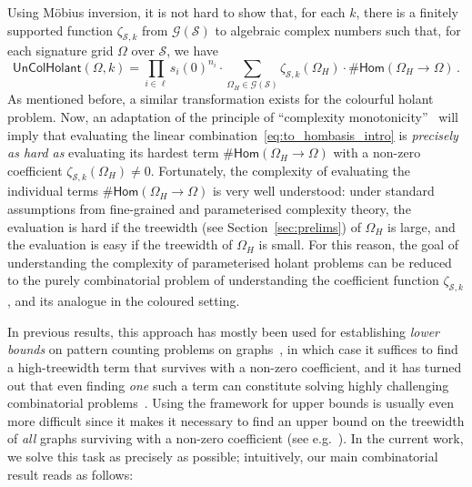 \documentclass[authorcolumns,numberwithinsect]{no-lipics-v2022}
\newcommand{\homs}[2]{\mathsf{Hom}(#1 \to #2)}
\begin{document}
Using M\"obius inversion, it is not hard to show that, for each $k$, there is a finitely supported function $\zeta_{\mathcal{S},k}$ from $\mathcal{G}(\mathcal{S})$ to algebraic complex numbers such that, for each signature grid $\Omega$ over $\mathcal{S}$, we have
\begin{equation}\label{eq:to_hombasis_intro}
    \mathsf{UnColHolant}(\Omega,k) = \prod_{i\in \ell}s_i(0)^{n_i} \cdot \sum_{\Omega_H\in \mathcal{G}(\mathcal{S})} \zeta_{\mathcal{S},k}(\Omega_H) \cdot \#\homs{\Omega_H}{\Omega}\,.
\end{equation}
As mentioned before, a similar transformation exists for the colourful holant problem.
Now, an adaptation of the principle of ``complexity monotonicity''~\cite{CurticapeanDM17} will imply that evaluating the linear combination~\eqref{eq:to_hombasis_intro} is \emph{precisely as hard as} evaluating its hardest term $\#\homs{\Omega_H}{\Omega}$ with a non-zero coefficient $\zeta_{\mathcal{S},k}(\Omega_H)\neq 0$. Fortunately, the complexity of evaluating the individual terms $\#\homs{\Omega_H}{\Omega}$ is very well understood: under standard assumptions from fine-grained and parameterised complexity theory, the evaluation is hard if the treewidth (see Section~\ref{sec:prelims}) of $\Omega_H$ is large, and the evaluation is easy if the treewidth of $\Omega_H$ is small. For this reason, the goal of understanding the complexity of parameterised holant problems can be reduced to the purely combinatorial problem of understanding the coefficient function $\zeta_{\mathcal{S},k}$, and its analogue in the coloured setting.

In previous results, this approach has mostly been used for establishing \emph{lower bounds} on pattern counting problems on graphs~\cite{FockeR22,DoringMW24,Curticapean24,CurticapeanN24}, in which case it suffices to find a high-treewidth term that survives with a non-zero coefficient, and it has turned out that even finding \emph{one} such a term can constitute solving highly challenging combinatorial problems~\cite{RothSW20,PeyerimhoffRSSVW23,DoringMW24,DoringMW25}. Using the framework for upper bounds is usually even more difficult since it makes it necessary to find an upper bound on the treewidth of \emph{all} graphs surviving with a non-zero coefficient (see e.g.\ \cite{PeyerimhoffRSV21,BeraGLSS22,BressanR21,BLR23}). In the current work, we solve this task as precisely as possible; intuitively, our main combinatorial result reads as follows:
\end{document}
